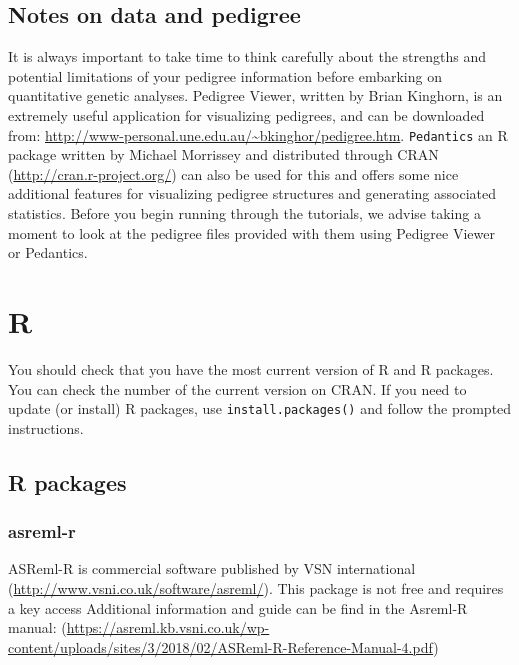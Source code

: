 \documentclass[
  12pt,
]{book}
\begin{document}
\hypertarget{notes-on-data-and-pedigree}{%
\subsection{Notes on data and pedigree}\label{notes-on-data-and-pedigree}}

It is always important to take time to think carefully about the strengths and potential limitations of your pedigree information before embarking on quantitative genetic analyses. Pedigree Viewer, written by Brian Kinghorn, is an extremely useful application for visualizing pedigrees, and can be downloaded from: \url{http://www-personal.une.edu.au/~bkinghor/pedigree.htm}. \texttt{Pedantics} an R package written by Michael Morrissey and distributed through CRAN (\url{http://cran.r-project.org/}) can also be used for this and offers some nice additional features for visualizing pedigree structures and generating associated statistics. Before you begin running through the tutorials, we advise taking a moment to look at the pedigree files provided with them using Pedigree Viewer or Pedantics.

\hypertarget{r}{%
\section{R}\label{r}}

You should check that you have the most current version of R and R packages. You can check the number of the current version on CRAN. If you need to update (or install) R packages, use \texttt{install.packages()} and follow the prompted instructions.

\hypertarget{r-packages}{%
\subsection{R packages}\label{r-packages}}

\hypertarget{asreml-r}{%
\subsubsection{asreml-r}\label{asreml-r}}

ASReml-R is commercial software published by VSN international (\url{http://www.vsni.co.uk/software/asreml/}). This package is not free and requires a key access
Additional information and guide can be find in the Asreml-R manual: (\url{https://asreml.kb.vsni.co.uk/wp-content/uploads/sites/3/2018/02/ASReml-R-Reference-Manual-4.pdf})
\end{document}
